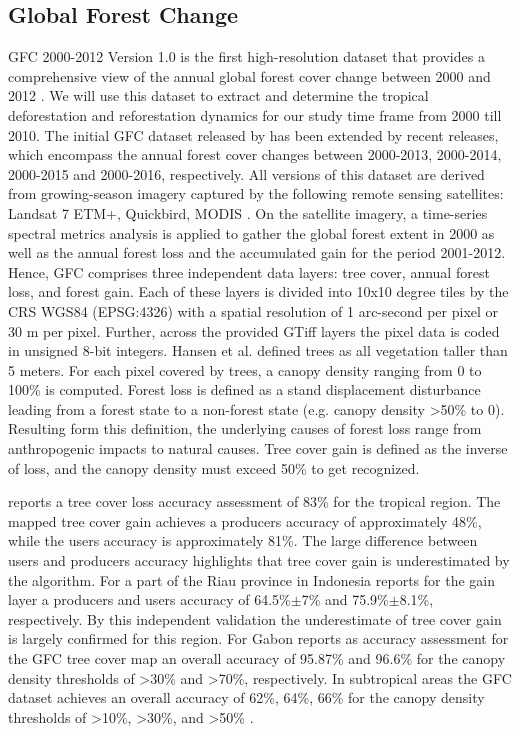 	\subsection{Global Forest Change}
	\label{subsec:methods_gfc}
		\ac{GFC} 2000-2012 Version 1.0 is the first high-resolution dataset that provides a comprehensive view of the annual global forest cover change between 2000 and 2012 \citep{Hansen2013,Li2017}. We will use this dataset to extract and determine the tropical deforestation and reforestation dynamics for our study time frame from 2000 till 2010. The initial \ac{GFC} dataset released by \citeauthor{Hansen2013} has been extended by recent releases, which encompass the annual forest cover changes between 2000-2013, 2000-2014, 2000-2015 and 2000-2016, respectively. All versions of this dataset are derived from growing-season imagery captured by the following remote sensing satellites: Landsat 7 ETM+, Quickbird, MODIS \citep{Hansen2013}. On the satellite imagery, a time-series spectral metrics analysis is applied to gather the global forest extent in 2000 as well as the annual forest loss and the accumulated gain for the period 2001-2012. Hence, \ac{GFC} comprises three independent data layers: tree cover, annual forest loss, and forest gain. Each of these layers is divided into 10x10 degree tiles by the \ac{CRS} \ac{WGS84} (EPSG:4326) with a spatial resolution of 1 arc-second per pixel or 30 m per pixel. Further, across the provided \ac{GTiff} layers the pixel data is coded in unsigned 8-bit integers. Hansen et al. defined trees as all vegetation taller than 5 meters. For each pixel covered by trees, a canopy density ranging from 0 to 100\% is computed. Forest loss is defined as a stand displacement disturbance leading from a forest state to a non-forest state (e.g. canopy density >50\% to 0). Resulting form this definition, the underlying causes of forest loss range from anthropogenic impacts to natural causes. Tree cover gain is defined as the inverse of loss, and the canopy density must exceed 50\% to get recognized.

		\citet{Hansen2013} reports a tree cover loss accuracy assessment of 83\% for the tropical region. The mapped tree cover gain achieves a producers accuracy of approximately 48\%, while the users accuracy is approximately 81\%. The large difference between users and producers accuracy highlights that tree cover gain is underestimated by the algorithm. For a part of the Riau province in Indonesia \citet{Arjasakusuma2018} reports for the gain layer a producers and users accuracy of 64.5\%$\pm$7\% and 75.9\%$\pm$8.1\%, respectively. By this independent validation the underestimate of tree cover gain is largely confirmed for this region. For Gabon \citet{Sannier2016} reports as accuracy assessment for the \ac{GFC} tree cover map an overall accuracy of 95.87\% and 96.6\% for the canopy density thresholds of >30\% and >70\%, respectively. In subtropical areas the \ac{GFC} dataset achieves an overall accuracy of 62\%, 64\%, 66\% for the canopy density thresholds of >10\%, >30\%, and >50\% \citep{McRoberts2016}.

